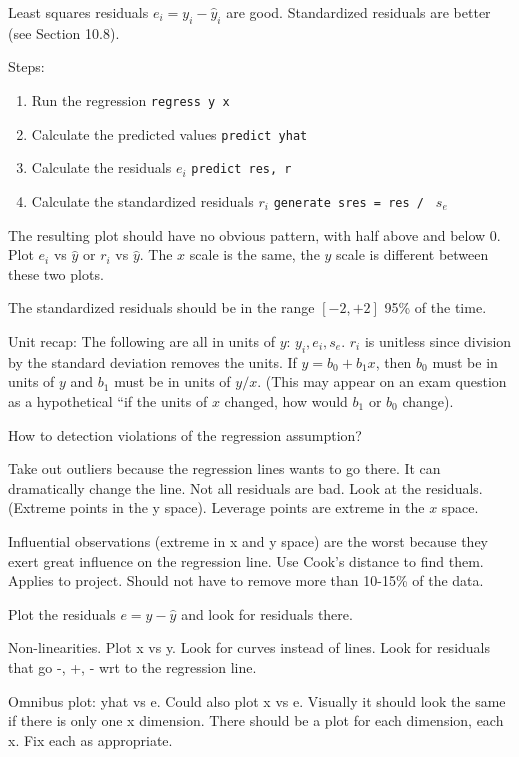 \documentclass[11pt, oneside]{article}   	%
\begin{document}
Least squares residuals $e_i = y_i - \hat{y}_i$ are good. Standardized residuals are better (see Section 10.8).

Steps:
\begin{enumerate}
\item{Run the regression \texttt{regress y x}}
\item{Calculate the predicted values \texttt{predict yhat}}
\item{Calculate the residuals $e_i$ \texttt{predict res, r}}
\item{Calculate the standardized residuals $r_i$ \texttt{generate sres = res / } $s_e$}
\end{enumerate}

The resulting plot should have no obvious pattern, with half above and below 0. Plot $e_i$ vs $\hat{y}$ or $r_i$ vs $\hat{y}$. The $x$ scale is the same, the $y$ scale is different between these two plots.

The standardized residuals should be in the range $[-2, +2]$ 95\% of the time.

Unit recap: The following are all in units of $y$: $y_i, e_i, s_e$. $r_i$ is unitless since division by the standard deviation removes the units. If $y = b_0 + b_1 x$, then $b_0$ must be in units of $y$ and $b_1$ must be in units of $y/x$. (This may appear on an exam question as a hypothetical ``if the units of $x$ changed, how would $b_1$ or $b_0$ change).

How to detection violations of the regression assumption?

Take out outliers because the regression lines wants to go there. It can dramatically change the line. Not all residuals are bad. Look at the residuals. (Extreme points in the y space). Leverage points are extreme in the $x$ space.

Influential observations (extreme in x and y space) are the worst because they exert great influence on the regression line. Use Cook's distance to find them. Applies to project. Should not have to remove more than 10-15\% of the data.

Plot the residuals $e = y - \hat{y}$ and look for residuals there.

Non-linearities. Plot x vs y. Look for curves instead of lines.  Look for residuals that go -, +, - wrt to the regression line.

Omnibus plot: yhat vs e. Could also plot x vs e. Visually it should look the same if there is only one x dimension. There should be a plot for each dimension, each x. Fix each as appropriate.
\end{document}
